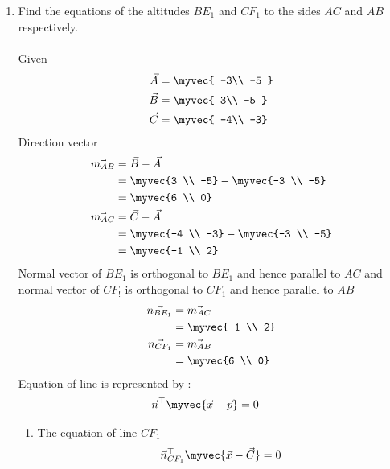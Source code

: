 \documentclass[11pt]{book}
\begin{document}
\begin{enumerate}[label=\thesection.\arabic*.,ref=\thesection.\theenumi]
\item Find the equations of the altitudes $BE_1$ and $CF_1$ to the sides $AC$ and $AB$ respectively. 
  \\    \\ \solution Given 
    \begin{align} 
 \vec{A} &= \myvec{ -3\\ -5 } \\ \vec{B} &= \myvec{ 3\\ -5 }
  \\\vec{C} &= \myvec{ -4\\ -3}
 \end{align}
 Direction vector 
 \begin{align}
     \vec{m_{AB}}&=\vec{B}-\vec{A} \\
           &=\myvec{3 \\ -5} -\myvec{-3 \\ -5}  \\
           &=\myvec{6 \\ 0} \\
    \vec{ m_{AC}}&=\vec{C}-\vec{A} \\
     &=\myvec{-4 \\ -3} -\myvec{-3 \\ -5}  \\
     &=\myvec{-1 \\ 2} \\
 \end{align}
  Normal vector of $BE_1$ is orthogonal to $BE_1$  and hence parallel to $AC$ and normal vector of $CF_!$ is orthogonal to $CF_1$ and hence parallel to $AB$
  \begin{align}
      \vec{n_{BE_1}}&=\vec{m_{AC}}\\
      &=\myvec{-1 \\ 2}\\
      \vec{n_{CF_1}}&=\vec{m_{AB}}\\
      &=\myvec{6 \\ 0}\\
  \end{align}
  Equation of line is represented by :
  \begin{align}
      \vec{n}^{\top}\myvec{\vec{x}-\vec{p}}&=0
  \end{align}
  \begin{enumerate}
      \item The equation of line $CF_1$
      \begin{align}
          \vec{n}^{\top}_{CF_1}\myvec{\vec{x}-\vec{C}}&=0 \\

\end{align}
\end{enumerate}
\end{enumerate}
\end{document}

